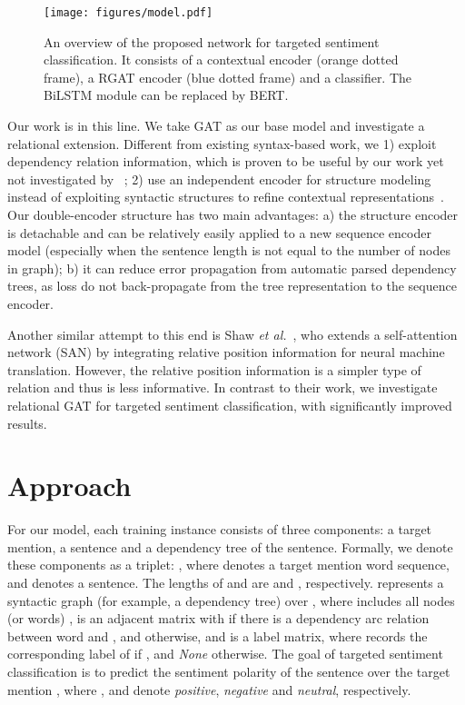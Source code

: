 \documentclass[journal]{IEEEtran}
\begin{document}
	\begin{figure*}[!t]
		\centering
		\texttt{[image: figures/model.pdf]}
		\caption{An overview of the proposed network for targeted sentiment classification\protect\footnotemark. It consists of a contextual encoder (orange dotted frame), a RGAT encoder (blue dotted frame) and a classifier. The BiLSTM module can be replaced by BERT.}
		\label{fig:one}
	\end{figure*}
	Our work is in this line. We take GAT as our base model and investigate a relational extension. 
	{
	Different from existing syntax-based work, we 1) exploit dependency relation information, which is proven to be useful by our work yet not investigated by ~\cite{sun-etal-2019-aspect,huang-carley-2019-syntax, zhang-etal-2019-aspect};
	2) use an independent encoder for structure modeling instead of exploiting syntactic structures to refine contextual representations~\cite{sun-etal-2019-aspect,huang-carley-2019-syntax,zhang-etal-2019-aspect,wang-etal-2020-relational}. Our double-encoder structure has two main advantages: a) the structure encoder is detachable and can be relatively easily applied to a new sequence encoder model (especially when the sentence length is not equal to the number of nodes in graph); b) it can reduce error propagation from automatic parsed dependency trees, as loss do not back-propagate from the tree representation to the sequence encoder.
	}

	{
		Another similar attempt to this end is Shaw \textit{et al.}~\cite{shaw-etal-2018-self}, who extends a self-attention network (SAN) by integrating relative position information for neural machine translation.
However, the relative position information is a simpler type of relation and thus is less informative.
	} 
	In contrast to their work, we investigate relational GAT for targeted sentiment classification, with significantly improved results.
	
	
	\section{Approach}
	For our model, each training instance consists of three components: a target mention, a sentence and a dependency tree of the sentence.
	Formally, we denote these components as a triplet: , 
where  denotes a target mention word sequence, and  denotes a sentence. The lengths of  and  are  and , respectively.
	 represents a syntactic graph (for example, a dependency tree) over , where  includes all nodes (or words) ,  is an adjacent matrix  with  if there is a dependency arc relation between word  and , and  otherwise, and  is a label matrix, where  records the corresponding label of  if , and  \textit{None} otherwise.
	The goal of targeted sentiment classification is to predict the sentiment polarity  of the sentence  over the target mention , where ,  and  denote \textit{positive}, \textit{negative} and \textit{neutral}, respectively.
	
\end{document}
